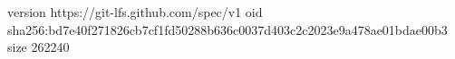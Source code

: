 version https://git-lfs.github.com/spec/v1
oid sha256:bd7e40f271826cb7cf1fd50288b636c0037d403c2c2023e9a478ae01bdae00b3
size 262240
